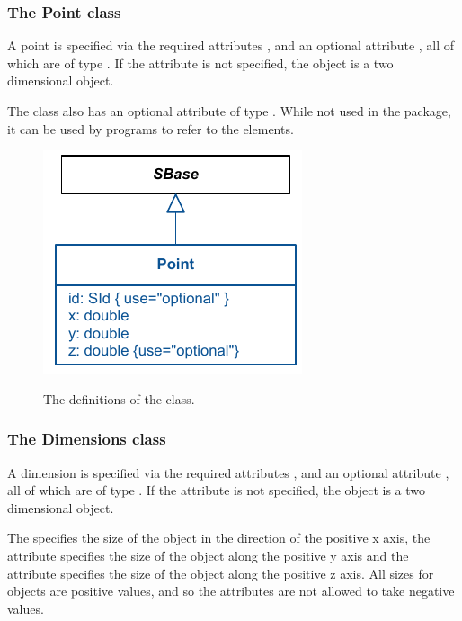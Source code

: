 \subsubsection{The Point class} \label{point-class} 
\label{position-class} A point is specified via the required attributes 
,  and an optional attribute , all of which 
are of type . If the attribute  is not 
specified, the object is a two dimensional object. 

The \Point class also has an optional attribute  of type 
. While not used in the \Layout package, it can be used 
by programs to refer to the elements. 

\begin{figure}[!h]
\includegraphics{uml/layout-point-uml}\\
\caption{The definitions of the \Point class.}
\label{uml:point}
\end{figure}

\subsubsection{The Dimensions class} \label{dimensions-class} A 
dimension is specified via the required attributes , 
 and an optional attribute , all of which are 
of type . If the attribute  is not 
specified, the object is a two dimensional object. 

The  specifies the size of the object in the direction of 
the positive x axis, the  attribute specifies the size of 
the object along the positive y axis and the  attribute 
specifies the size of the object along the positive z axis. All sizes 
for \Dimensions objects are positive values, and so the attributes are 
not allowed to take negative values. 

